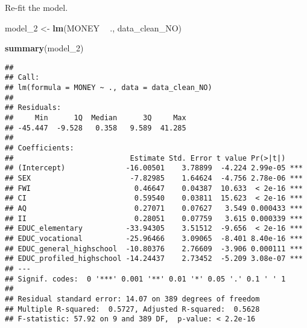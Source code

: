 \documentclass[]{article}
\newenvironment{Shaded}{\begin{snugshade}}{\end{snugshade}}
\newcommand{\DecValTok}[1]{\textcolor[rgb]{0.00,0.00,0.81}{#1}}
\newcommand{\KeywordTok}[1]{\textcolor[rgb]{0.13,0.29,0.53}{\textbf{#1}}}
\newcommand{\NormalTok}[1]{#1}
\newcommand{\OperatorTok}[1]{\textcolor[rgb]{0.81,0.36,0.00}{\textbf{#1}}}
\newcommand{\StringTok}[1]{\textcolor[rgb]{0.31,0.60,0.02}{#1}}
\begin{document}
\begin{Shaded}
\end{Shaded}

Re-fit the model.

\begin{Shaded}
\begin{Highlighting}[]
\NormalTok{model_}\DecValTok{2}\NormalTok{ <-}\StringTok{ }\KeywordTok{lm}\NormalTok{(MONEY }\OperatorTok{~}\StringTok{ }\NormalTok{., data_clean_NO)}
\end{Highlighting}
\end{Shaded}

\begin{Shaded}
\begin{Highlighting}[]
\KeywordTok{summary}\NormalTok{(model_}\DecValTok{2}\NormalTok{)}
\end{Highlighting}
\end{Shaded}

\begin{verbatim}
## 
## Call:
## lm(formula = MONEY ~ ., data = data_clean_NO)
## 
## Residuals:
##     Min      1Q  Median      3Q     Max 
## -45.447  -9.528   0.358   9.589  41.285 
## 
## Coefficients:
##                           Estimate Std. Error t value Pr(>|t|)    
## (Intercept)              -16.00501    3.78899  -4.224 2.99e-05 ***
## SEX                       -7.82985    1.64624  -4.756 2.78e-06 ***
## FWI                        0.46647    0.04387  10.633  < 2e-16 ***
## CI                         0.59540    0.03811  15.623  < 2e-16 ***
## AQ                         0.27071    0.07627   3.549 0.000433 ***
## II                         0.28051    0.07759   3.615 0.000339 ***
## EDUC_elementary          -33.94305    3.51512  -9.656  < 2e-16 ***
## EDUC_vocational          -25.96466    3.09065  -8.401 8.40e-16 ***
## EDUC_general_highschool  -10.80376    2.76609  -3.906 0.000111 ***
## EDUC_profiled_highschool -14.24437    2.73452  -5.209 3.08e-07 ***
## ---
## Signif. codes:  0 '***' 0.001 '**' 0.01 '*' 0.05 '.' 0.1 ' ' 1
## 
## Residual standard error: 14.07 on 389 degrees of freedom
## Multiple R-squared:  0.5727, Adjusted R-squared:  0.5628 
## F-statistic: 57.92 on 9 and 389 DF,  p-value: < 2.2e-16
\end{verbatim}
\end{document}

